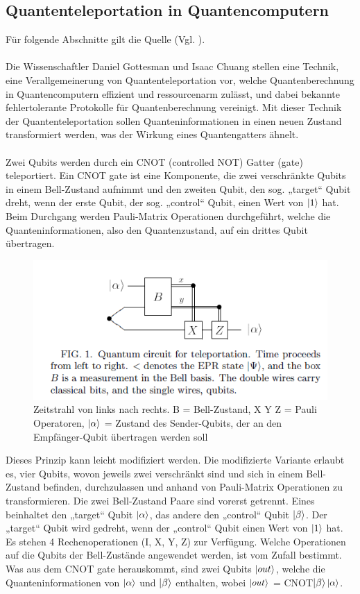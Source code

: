 \subsection{Quantenteleportation in Quantencomputern}
Für folgende Abschnitte gilt die Quelle (Vgl. \cite[S.1-2]{gottesman_quantum_1999}).\\
\\
Die Wissenschaftler Daniel Gottesman und Isaac Chuang stellen eine Technik, eine Verallgemeinerung von Quantenteleportation vor, welche Quantenberechnung in Quantencomputern effizient und ressourcenarm zulässt, und dabei bekannte fehlertolerante Protokolle für Quantenberechnung vereinigt. Mit dieser Technik der Quantenteleportation sollen Quanteninformationen in einen neuen Zustand transformiert werden, was der Wirkung eines Quantengatters ähnelt.\\
\\
Zwei Qubits werden durch ein CNOT (controlled NOT) Gatter (gate) teleportiert. Ein CNOT gate ist eine Komponente, die zwei verschränkte Qubits in einem Bell-Zustand aufnimmt und den zweiten Qubit, den sog. „target“ Qubit dreht, wenn der erste Qubit, der sog. „control“ Qubit, einen Wert von \(\ket{1}\) hat. Beim Durchgang werden Pauli-Matrix Operationen durchgeführt, welche die Quanteninformationen, also den Quantenzustand, auf ein drittes Qubit übertragen.\\
\begin{figure}[h!]
    \centering
    \includegraphics[width=1.0\textwidth]{images/quantenteleportation_cnot_1.png}
    \caption{Zeitstrahl von links nach rechts. B = Bell-Zustand, X Y Z = Pauli Operatoren, \(\ket{\alpha}\) = Zustand des Sender-Qubits, der an den Empfänger-Qubit übertragen werden soll}
    \label{fig:meinbild}
\end{figure}
\newpage
\noindent Dieses Prinzip kann leicht modifiziert werden. Die modifizierte Variante erlaubt es, vier Qubits, wovon jeweils zwei verschränkt sind und sich in einem Bell-Zustand befinden, durchzulassen und anhand von Pauli-Matrix Operationen zu transformieren. Die zwei Bell-Zustand Paare sind vorerst getrennt. Eines beinhaltet den „target“ Qubit \(\ket{\alpha}\), das andere den „control“ Qubit \(\ket{\beta}\). Der „target“ Qubit wird gedreht, wenn der „control“ Qubit einen Wert von \(\ket{1}\) hat. Es stehen 4 Rechenoperationen (I, X, Y, Z) zur Verfügung. Welche Operationen auf die Qubits der Bell-Zustände angewendet werden, ist vom Zufall bestimmt. Was aus dem CNOT gate herauskommt, sind zwei Qubits \(\ket{out}\), welche die Quanteninformationen von \(\ket{\alpha}\) und \(\ket{\beta}\) enthalten, wobei \(\ket{out}\) = CNOT\(\ket{\beta}\)\(\ket{\alpha}\).\\
